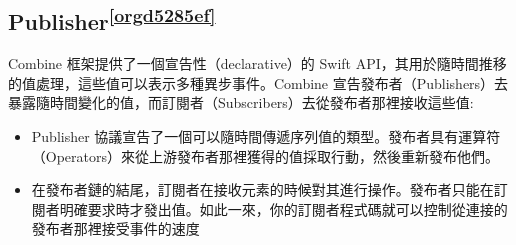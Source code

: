 \documentclass[a4paper,12pt]{article}
\begin{document}
\subsection{Publisher\textsuperscript{\ref{orgd5285ef}}}
\label{sec:org357fa48}
Combine 框架提供了一個宣告性（declarative）的 Swift API，其用於隨時間推移的值處理，這些值可以表示多種異步事件。Combine 宣告發布者（Publishers）去暴露隨時間變化的值，而訂閱者（Subscribers）去從發布者那裡接收這些值:\\
\begin{itemize}
\item Publisher 協議宣告了一個可以隨時間傳遞序列值的類型。發布者具有運算符（Operators）來從上游發布者那裡獲得的值採取行動，然後重新發布他們。\\
\item 在發布者鏈的結尾，訂閱者在接收元素的時候對其進行操作。發布者只能在訂閱者明確要求時才發出值。如此一來，你的訂閱者程式碼就可以控制從連接的發布者那裡接受事件的速度\\
\end{itemize}
\end{document}
